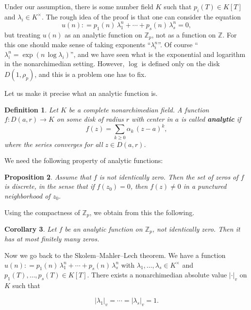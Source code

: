 \documentclass{article}
\newcommand{\term}{\textbf}
\newcommand{\dfn}{\mathrel{\mathop:}=}
\newcommand{\ZZ}{\mathbb{Z}}
\theoremstyle{myplain}
\newtheorem{proposition}{Proposition}[section]
\newtheorem{corollary}[proposition]{Corollary}
\theoremstyle{mydefinition}
\newtheorem{definition}[proposition]{Definition}
\begin{document}
\vspace{1em}

Under our assumption, there is some number field $K$ such that
$p_i (T) \in K [T]$ and $\lambda_i \in K^\times$. The rough idea of the proof is
that one can consider the equation
$$u (n) \dfn p_1 (n) \, \lambda_1^n + \cdots + p_s (n) \, \lambda_s^n = 0,$$
but treating $u (n)$ as an analytic function on $\ZZ_p$, not as a function on
$\ZZ$. For this one should make sense of taking exponents ``$\lambda_i^n$''.
Of course ``$\lambda_i^n = \exp (n \, \log \lambda_i)$'', and we have seen what
is the exponential and logarithm in the nonarchimedian setting. However, $\log$
is defined only on the disk $D (1, \rho_p)$, and this is a problem one has to
fix.

\vspace{1em}

Let us make it precise what an analytic function is.

\begin{definition}
  Let $K$ be a complete nonarchimedian field. A function
  $f\colon D (a, r) \to K$ on some disk of radius $r$ with center in $a$ is
  called \term{analytic} if
  $$f (z) = \sum_{k \ge 0} \alpha_k \, (z - a)^k,$$
  where the series converges for all $z \in D (a, r)$.
\end{definition}

We need the following property of analytic functions:

\begin{proposition}
  Assume that $f$ is not identically zero. Then the set of zeros of $f$ is
  discrete, in the sense that if $f (z_0) = 0$, then $f (z) \ne 0$ in a
  punctured neighborhood of $z_0$.
\end{proposition}

Using the compactness of $\ZZ_p$, we obtain from this the following.

\begin{corollary}
  Let $f$ be an analytic function on $\ZZ_p$, not identically zero. Then it has
  at most finitely many zeros.
\end{corollary}

Now we go back to the Skolem--Mahler--Lech theorem. We have a function
$u (n) \dfn p_1 (n) \, \lambda_1^n + \cdots + p_s (n) \, \lambda_s^n$ with
$\lambda_1, \ldots, \lambda_s \in K^\times$ and
$p_1 (T), \ldots, p_s (T) \in K [T]$. There exists a nonarchimedian absolute
value $|\cdot|_v$ on $K$ such that

\[ |\lambda_1|_v = \cdots = |\lambda_s|_v = 1. \]
\end{document}
